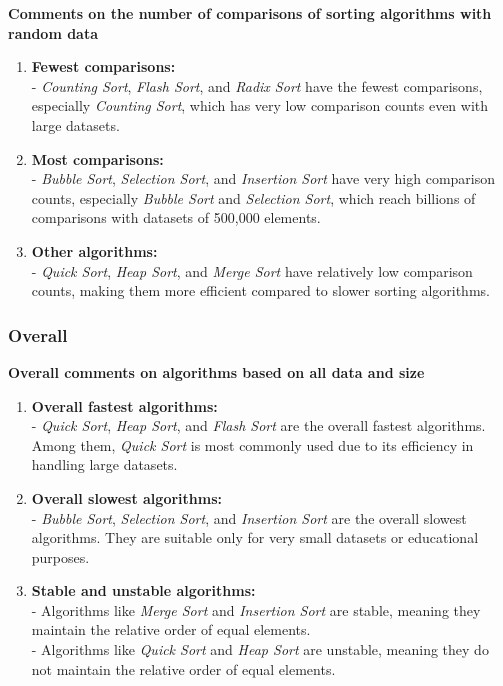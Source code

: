 \textbf{Comments on the number of comparisons of sorting algorithms with random data}
\begin{enumerate}
    \item \textbf{Fewest comparisons:} \\
   - \textit{Counting Sort}, \textit{Flash Sort}, and \textit{Radix Sort} have the fewest comparisons, especially \textit{Counting Sort}, which has very low comparison counts even with large datasets.

    \item \textbf{Most comparisons:} \\
   - \textit{Bubble Sort}, \textit{Selection Sort}, and \textit{Insertion Sort} have very high comparison counts, especially \textit{Bubble Sort} and \textit{Selection Sort}, which reach billions of comparisons with datasets of 500,000 elements.

    \item \textbf{Other algorithms:} \\
   - \textit{Quick Sort}, \textit{Heap Sort}, and \textit{Merge Sort} have relatively low comparison counts, making them more efficient compared to slower sorting algorithms.
\end{enumerate}

\subsubsection{Overall}
\textbf{Overall comments on algorithms based on all data and size}

\begin{enumerate}
    \item \textbf{Overall fastest algorithms:} \\
   - \textit{Quick Sort}, \textit{Heap Sort}, and \textit{Flash Sort} are the overall fastest algorithms. Among them, \textit{Quick Sort} is most commonly used due to its efficiency in handling large datasets.

    \item \textbf{Overall slowest algorithms:} \\
   - \textit{Bubble Sort}, \textit{Selection Sort}, and \textit{Insertion Sort} are the overall slowest algorithms. They are suitable only for very small datasets or educational purposes.

    \item \textbf{Stable and unstable algorithms:} \\
   - Algorithms like \textit{Merge Sort} and \textit{Insertion Sort} are stable, meaning they maintain the relative order of equal elements. \\
   - Algorithms like \textit{Quick Sort} and \textit{Heap Sort} are unstable, meaning they do not maintain the relative order of equal elements.
\end{enumerate}
